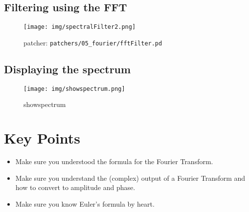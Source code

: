\subsection{Filtering using the FFT}
\begin{figure}[h]
	\begin{center}
		\texttt{[image: img/spectralFilter2.png]}
		\caption{patcher: \texttt{patchers/05\_fourier/fftFilter.pd}}
		\label{fig:spectralFilter}
	\end{center}
\end{figure}
\subsection{Displaying the spectrum}
\begin{figure}[h]
	\begin{center}
		\texttt{[image: img/showspectrum.png]}
		\caption{showspectrum}
		\label{fig:showspectrum}
	\end{center}
\end{figure}

\section{Key Points}
\begin{itemize}
	\item Make sure you understood the formula for the Fourier Transform.
	\item Make sure you understand the (complex) output of a Fourier Transform and how to convert to amplitude and phase.
	\item Make sure you know Euler's formula by heart.
\end{itemize}

